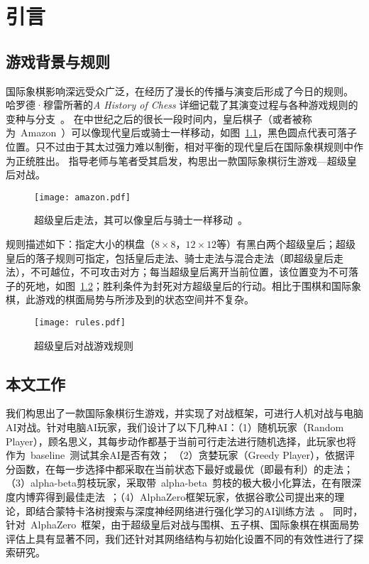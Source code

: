 \chapter{引言}
\label{chap:introduction}

\section{游戏背景与规则}
国际象棋影响深远受众广泛，在经历了漫长的传播与演变后形成了今日的规则。
哈罗德·穆雷所著的\textit{A History of Chess} 详细记载了其演变过程与各种游戏规则的变种与分支~\cite{murray2015history}。
在中世纪之后的很长一段时间内，皇后棋子（或者被称为~Amazon~）可以像现代皇后或骑士一样移动，如图~\ref{fig:superQueen}，黑色圆点代表可落子位置。只不过由于其太过强力难以制衡，相对平衡的现代皇后在国际象棋规则中作为正统胜出。
指导老师与笔者受其启发，构思出一款国际象棋衍生游戏—超级皇后对战。
\begin{figure}[htb]
  \centering
  \texttt{[image: amazon.pdf]}
  \caption[superQueen]{%
    超级皇后走法，其可以像皇后与骑士一样移动~\cite{wikiAmazon}。}
  \label{fig:superQueen}
\end{figure}
规则描述如下：指定大小的棋盘（$8\times8$，$12\times12$等）有黑白两个超级皇后；超级皇后的落子规则可指定，包括皇后走法、骑士走法与混合走法（即超级皇后走法），不可越位，不可攻击对方；每当超级皇后离开当前位置，该位置变为不可落子的死地，如图~\ref{fig:superQueenRules}；胜利条件为封死对方超级皇后的行动。相比于围棋和国际象棋，此游戏的棋面局势与所涉及到的状态空间并不复杂。

\begin{figure}[htb]
    \centering
    \texttt{[image: rules.pdf]}
    \caption[superQueenRules]{%
      超级皇后对战游戏规则%
      }
    \label{fig:superQueenRules}
  \end{figure}


\section{本文工作}
我们构思出了一款国际象棋衍生游戏，并实现了对战框架，可进行人机对战与电脑AI对战。针对电脑AI玩家，我们设计了以下几种AI：（1）随机玩家（Random Player），顾名思义，其每步动作都基于当前可行走法进行随机选择，此玩家也将作为~baseline~测试其余AI是否有效；
（2）贪婪玩家（Greedy Player），依据评分函数，在每一步选择中都采取在当前状态下最好或最优（即最有利）的走法；（3）alpha-beta剪枝玩家，采取带~alpha-beta~剪枝的极大极小化算法，在有限深度内博弈得到最佳走法~\cite{russell2010artificial}；（4）AlphaZero框架玩家，依据谷歌公司提出来的理论，即结合蒙特卡洛树搜索与深度神经网络进行强化学习的AI训练方法~\cite{Silver1140}。
同时，针对~AlphaZero~框架，由于超级皇后对战与围棋、五子棋、国际象棋在棋面局势评估上具有显著不同，我们还针对其网络结构与初始化设置不同的有效性进行了探索研究。

